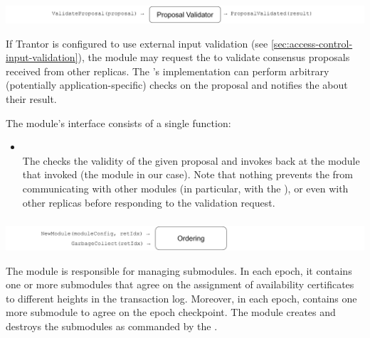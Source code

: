 \documentclass{article}
\begin{document}
\subsubsection{}
\label{sec:module-proposal-validator}

\includegraphics[width=\textwidth]{figures/modules/module-proposal-validator.pdf}

If Trantor is configured to use external input validation (see \cref{sec:access-control-input-validation}),
the  module may request the  to validate consensus proposals received from other replicas.
The 's implementation can perform arbitrary (potentially application-specific) checks on the proposal
and notifies the  about their result.

The  module's interface consists of a single function:

\begin{itemize}
    
    \item {}\\
    The  checks the validity of the given proposal and invokes 
    back at the module that invoked  (the  module in our case).
    Note that nothing prevents the  from communicating with other modules
    (in particular, with the ), or even with other replicas before responding to the validation request.
    
\end{itemize}

\subsubsection{}
\label{sec:module-ordering}

\includegraphics[width=\textwidth]{figures/modules/module-ordering.pdf}

The  module is responsible for managing  submodules.
In each epoch, it contains one or more submodules that agree on the assignment of availability certificates
to different heights in the transaction log.
Moreover, in each epoch,  contains one more submodule to agree on the epoch checkpoint.
The  module creates and destroys the submodules as commanded by the .
\end{document}

